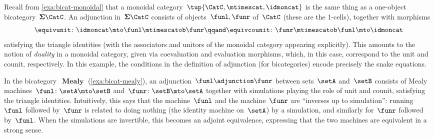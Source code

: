 \begin{example}
    \label{exa:bicat-adj-monoidal}
    Recall from \cref{exa:bicat-monoidal} that a monoidal category~$\tup{\CatC, \mtimescat, \idmoncat}$ is the same thing as a one-object bicategory~$\mathbf{\Sigma}\CatC$.
    An adjunction in~$\mathbf{\Sigma}\CatC$ consists of objects~$\funl, \funr$ of~$\CatC$ (these are the 1-cells), together with morphisms
    \begin{equation}
        \equivunit \colon \idmoncat \mto \funl \mtimescatob \funr \qqand \equivcounit \colon \funr \mtimescatob \funl \mto \idmoncat
    \end{equation}
    satisfying the triangle identities (with the associators and unitors of the monoidal category appearing explicitly).
    This amounts to the notion of \emph{duality} in a monoidal category, given via  coevaluation and  evaluation morphisms, which, in this case, correspond to the unit and counit, respectively. In this example, the conditions in the definition of adjunction (for bicategories) encode precisely the snake equations. 
\end{example}

\begin{example}
    \label{exa:bicat-adj-mealy}
    In the bicategory~$\operatorname{\textbf{Mealy}}$ (\cref{exa:bicat-mealy}), an adjunction~$\funl \adjunction \funr$ between sets~$\setA$ and~$\setB$ consists of Mealy machines~$\funl \colon \setA \mto \setB$ and~$\funr \colon \setB \mto \setA$ together with simulations playing the role of unit and counit, satisfying the triangle identities.
    Intuitively, this says that the machine~$\funl$ and the machine~$\funr$ are ``inverses up to simulation'': running~$\funl$ followed by~$\funr$ is related to doing nothing (the identity machine on~$\setA$) by a simulation, and similarly for~$\funr$ followed by~$\funl$.
    When the simulations are invertible, this becomes an adjoint equivalence, expressing that the two machines are equivalent in a strong sense.
\end{example}

